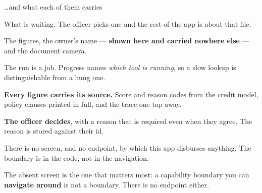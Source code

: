 \documentclass[aspectratio=169,11pt,t]{beamer}
\begin{document}
\begin{frame}[shrink=25]{\ldots{}and what each of them carries}
\begin{minipage}[t]{0.3253\textwidth}
\begin{icard}
What is waiting. The officer picks one and the rest of the app is about that file.
\end{icard}
\end{minipage}%
\hfill
\begin{minipage}[t]{0.3253\textwidth}
\begin{icard}
The figures, the owner's name --- \textbf{shown here and carried nowhere else} --- and the document camera.
\end{icard}
\end{minipage}%
\hfill
\begin{minipage}[t]{0.3253\textwidth}
\begin{icard}
The run is a job. Progress names \textit{which tool is running}, so a slow lookup is distinguishable from a hung one.
\end{icard}
\end{minipage}%


\vskip 4pt

\begin{minipage}[t]{0.3253\textwidth}
\begin{icardaccent}
\textbf{Every figure carries its source.} Score and reason codes from the credit model, policy clauses printed in full, and the trace one tap away.
\end{icardaccent}
\end{minipage}%
\hfill
\begin{minipage}[t]{0.3253\textwidth}
\begin{icardaccent}
\textbf{The officer decides}, with a reason that is required even when they agree. The reason is stored against their id.
\end{icardaccent}
\end{minipage}%
\hfill
\begin{minipage}[t]{0.3253\textwidth}
\begin{icardbad}
There is no screen, and no endpoint, by which this app disburses anything. The boundary is in the code, not in the navigation.
\end{icardbad}
\end{minipage}%
\begin{iband}[signal]
The absent screen is the one that matters most: a capability boundary you can \textbf{navigate around} is not a boundary. There is no endpoint either.
\end{iband}
\end{frame}
\end{document}
